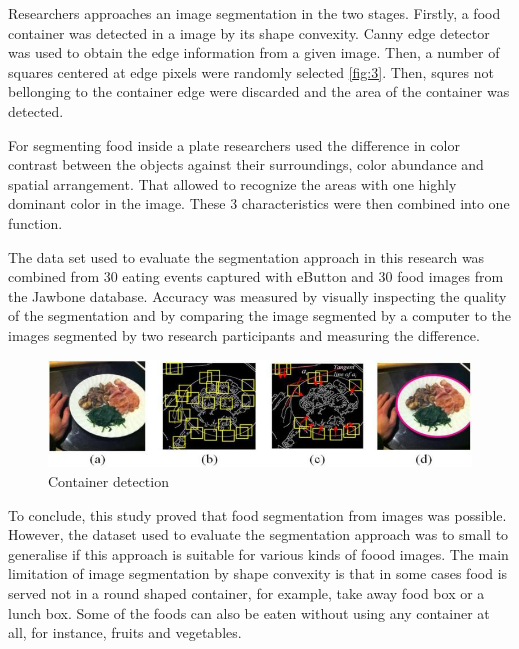 Researchers approaches an image segmentation in the two stages. Firstly, a food container was detected in a image by its shape convexity.  Canny edge detector was  used to obtain the edge information from a given image. Then, a number of squares centered at edge pixels were randomly selected \autoref{fig:3}. Then, squres not bellonging to the container edge were discarded and the area of the container was detected.

For segmenting  food inside a plate researchers used the difference in color contrast between the objects against their surroundings, color abundance and spatial arrangement. That allowed to recognize the areas with one highly dominant color in the image. These 3 characteristics were then combined into one function.

The data set used to evaluate the segmentation approach in this research was combined from 30 eating events captured with eButton and 30 food images from the Jawbone database. Accuracy was measured by visually inspecting the quality of the segmentation and by comparing the image segmented by a computer to the images segmented by two research participants and measuring the difference. 



\begin{figure}[ht]
\includegraphics{Figures/2/segm_03.jpg}
\caption{Container detection \citep{chen2015saliency}}
\label{fig:3}
\end{figure}
To conclude, this study proved that food segmentation from images was possible. However, the dataset used to evaluate the segmentation approach was to small to generalise if this approach is suitable for various kinds of foood images.
The main limitation of image segmentation by  shape convexity is that in some cases food is served not in a round shaped container, for example, take away food box or a lunch box. Some of the foods can also be eaten without using any container at all, for instance, fruits and vegetables.

